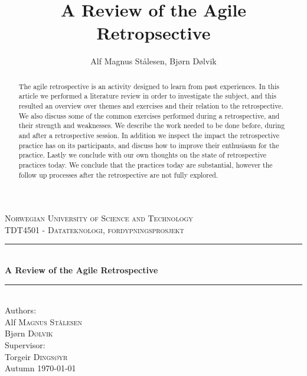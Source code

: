 \documentclass[12pt]{article}
\newcommand{\HRule}{\rule{\linewidth}{0.5mm}}
\begin{document}
\title{A Review of the Agile Retropsective}

\author{Alf Magnus Stålesen, Bjørn Dølvik}
\begin{titlepage}
\begin{center}

\textsc{\LARGE Norwegian University of Science and Technology}\\[1.5cm]

\textsc{\Large TDT4501 - Datateknologi, fordypningsprosjekt}\\[0.5cm]

\HRule \\[0.4cm]
{ \huge \bfseries A Review of the Agile Retrospective\\[0.4cm] }

\HRule \\[1.5cm]

{\large Authors:}\\

Alf \textsc{Magnus Stålesen}\\
Bjørn \textsc{Dølvik}\\[1.0cm]

{\large Supervisor:}\\

Torgeir \textsc{Dingsøyr}\\[1.0cm]

{\large Autumn}
{\large \today}

\end{center}
\end{titlepage}

\begin{abstract}

The agile retrospective is an activity designed to learn from past experiences. In this article we performed a literature review in order to investigate the subject, and this resulted an overview over themes and exercises and their relation to the retrospective. We also discuss some of the common exercises performed during a retrospective, and their strength and weaknesses. We describe the work needed to be done before, during and after a retrospective session. In addition we inspect the impact the retrospective practice has on its participants, and discuss how to improve their enthusiasm for the practice. Lastly we conclude with our own thoughts on the state of retrospective practices today. We conclude that the practices today are substantial, however the follow up processes after the retrospective are not fully explored.

\end{abstract}
\clearpage
\end{document}
